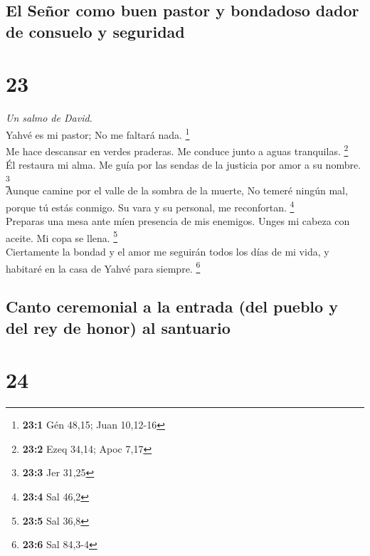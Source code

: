 \hypertarget{el-seuxf1or-como-buen-pastor-y-bondadoso-dador-de-consuelo-y-seguridad}{%
\subsection{El Señor como buen pastor y bondadoso dador de consuelo y
seguridad}\label{el-seuxf1or-como-buen-pastor-y-bondadoso-dador-de-consuelo-y-seguridad}}

\hypertarget{section-22}{%
\section{23}\label{section-22}}

\emph{Un salmo de David.}\\
 Yahvé es mi pastor; No me faltará nada. \footnote{\textbf{23:1}
  Gén 48,15; Juan 10,12-16}\\
 Me hace descansar en verdes praderas. Me conduce junto a
aguas tranquilas. \footnote{\textbf{23:2} Ezeq 34,14; Apoc 7,17}\\
 Él restaura mi alma. Me guía por las sendas de la
justicia por amor a su nombre. \footnote{\textbf{23:3} Jer 31,25}\\
 Aunque camine por el valle de la sombra de la muerte, No
temeré ningún mal, porque tú estás conmigo. Su vara y su personal, me
reconfortan. \footnote{\textbf{23:4} Sal 46,2}\\
 Preparas una mesa ante míen presencia de mis enemigos.
Unges mi cabeza con aceite. Mi copa se llena. \footnote{\textbf{23:5}
  Sal 36,8}\\
 Ciertamente la bondad y el amor me seguirán todos los
días de mi vida, y habitaré en la casa de Yahvé para siempre.
\footnote{\textbf{23:6} Sal 84,3-4}

\hypertarget{canto-ceremonial-a-la-entrada-del-pueblo-y-del-rey-de-honor-al-santuario}{%
\subsection{Canto ceremonial a la entrada (del pueblo y del rey de
honor) al
santuario}\label{canto-ceremonial-a-la-entrada-del-pueblo-y-del-rey-de-honor-al-santuario}}

\hypertarget{section-23}{%
\section{24}\label{section-23}}

